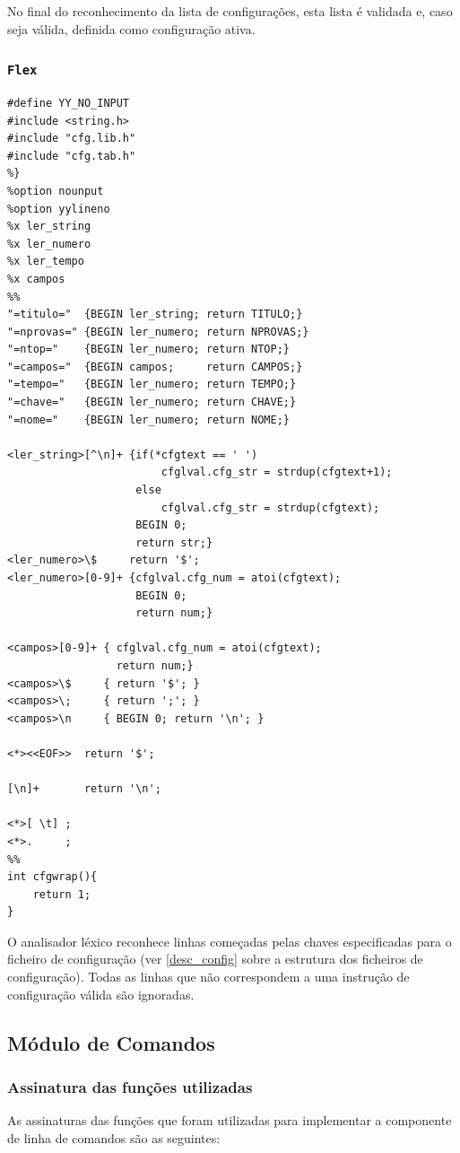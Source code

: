 \documentclass[11pt, a4paper, oneside]{article}
\begin{document}
No final do reconhecimento da lista de configurações, esta lista é validada e, caso seja válida, definida como configuração ativa.

\newpage
\subsubsection[Flex]{\texttt{Flex}}

\begin{lstlisting}[language={}, caption={Flex do módulo de configurações.}] 
%{
#define YY_NO_INPUT
#include <string.h>
#include "cfg.lib.h"
#include "cfg.tab.h"
%}
%option nounput
%option yylineno
%x ler_string
%x ler_numero
%x ler_tempo
%x campos
%%
"=titulo="  {BEGIN ler_string; return TITULO;}
"=nprovas=" {BEGIN ler_numero; return NPROVAS;}
"=ntop="    {BEGIN ler_numero; return NTOP;}
"=campos="  {BEGIN campos;     return CAMPOS;}
"=tempo="   {BEGIN ler_numero; return TEMPO;}
"=chave="   {BEGIN ler_numero; return CHAVE;}
"=nome="    {BEGIN ler_numero; return NOME;}

<ler_string>[^\n]+ {if(*cfgtext == ' ')
                        cfglval.cfg_str = strdup(cfgtext+1);
                    else
                        cfglval.cfg_str = strdup(cfgtext);
                    BEGIN 0;
                    return str;}
<ler_numero>\$     return '$';
<ler_numero>[0-9]+ {cfglval.cfg_num = atoi(cfgtext);
                    BEGIN 0;
                    return num;}

<campos>[0-9]+ { cfglval.cfg_num = atoi(cfgtext);
                 return num;}
<campos>\$     { return '$'; }
<campos>\;     { return ';'; }
<campos>\n     { BEGIN 0; return '\n'; }

<*><<EOF>>  return '$';

[\n]+       return '\n';

<*>[ \t] ;
<*>.     ;
%%
int cfgwrap(){
    return 1;
}
\end{lstlisting}

O analisador léxico reconhece linhas começadas pelas chaves especificadas para o ficheiro de configuração (ver \ref{desc_config} sobre a estrutura dos ficheiros de configuração). Todas as linhas que não correspondem a uma instrução de configuração válida são ignoradas.


\newpage
\subsection{Módulo de Comandos}

\subsubsection{Assinatura das funções utilizadas}
As assinaturas das funções que foram utilizadas para implementar a componente de linha de comandos são as seguintes:
\end{document}
